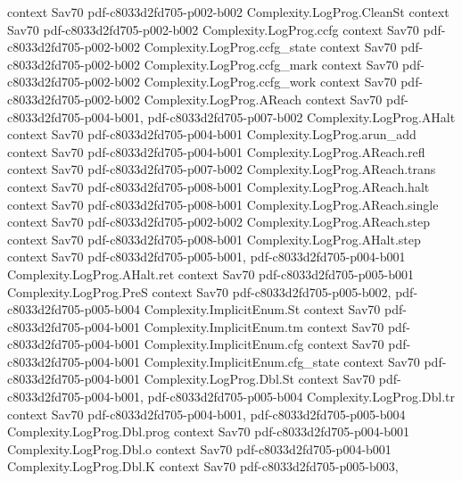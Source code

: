 \begin{theorem}
  {context}
  {Sav70}
  {pdf-c8033d2fd705-p002-b002}
\proofstep
  {Complexity.LogProg.CleanSt}
  {context}
  {Sav70}
  {pdf-c8033d2fd705-p002-b002}
\proofstep
  {Complexity.LogProg.ccfg}
  {context}
  {Sav70}
  {pdf-c8033d2fd705-p002-b002}
\proofstep
  {Complexity.LogProg.ccfg_state}
  {context}
  {Sav70}
  {pdf-c8033d2fd705-p002-b002}
\proofstep
  {Complexity.LogProg.ccfg_mark}
  {context}
  {Sav70}
  {pdf-c8033d2fd705-p002-b002}
\proofstep
  {Complexity.LogProg.ccfg_work}
  {context}
  {Sav70}
  {pdf-c8033d2fd705-p002-b002}
\proofstep
  {Complexity.LogProg.AReach}
  {context}
  {Sav70}
  {pdf-c8033d2fd705-p004-b001,
    pdf-c8033d2fd705-p007-b002}
\proofstep
  {Complexity.LogProg.AHalt}
  {context}
  {Sav70}
  {pdf-c8033d2fd705-p004-b001}
\proofstep
  {Complexity.LogProg.arun_add}
  {context}
  {Sav70}
  {pdf-c8033d2fd705-p004-b001}
\proofstep
  {Complexity.LogProg.AReach.refl}
  {context}
  {Sav70}
  {pdf-c8033d2fd705-p007-b002}
\proofstep
  {Complexity.LogProg.AReach.trans}
  {context}
  {Sav70}
  {pdf-c8033d2fd705-p008-b001}
\proofstep
  {Complexity.LogProg.AReach.halt}
  {context}
  {Sav70}
  {pdf-c8033d2fd705-p008-b001}
\proofstep
  {Complexity.LogProg.AReach.single}
  {context}
  {Sav70}
  {pdf-c8033d2fd705-p002-b002}
\proofstep
  {Complexity.LogProg.AReach.step}
  {context}
  {Sav70}
  {pdf-c8033d2fd705-p008-b001}
\proofstep
  {Complexity.LogProg.AHalt.step}
  {context}
  {Sav70}
  {pdf-c8033d2fd705-p005-b001,
    pdf-c8033d2fd705-p004-b001}
\proofstep
  {Complexity.LogProg.AHalt.ret}
  {context}
  {Sav70}
  {pdf-c8033d2fd705-p005-b001}
\proofstep
  {Complexity.LogProg.PreS}
  {context}
  {Sav70}
  {pdf-c8033d2fd705-p005-b002,
    pdf-c8033d2fd705-p005-b004}
\proofstep
  {Complexity.ImplicitEnum.St}
  {context}
  {Sav70}
  {pdf-c8033d2fd705-p004-b001}
\proofstep
  {Complexity.ImplicitEnum.tm}
  {context}
  {Sav70}
  {pdf-c8033d2fd705-p004-b001}
\proofstep
  {Complexity.ImplicitEnum.cfg}
  {context}
  {Sav70}
  {pdf-c8033d2fd705-p004-b001}
\proofstep
  {Complexity.ImplicitEnum.cfg_state}
  {context}
  {Sav70}
  {pdf-c8033d2fd705-p004-b001}
\proofstep
  {Complexity.LogProg.Dbl.St}
  {context}
  {Sav70}
  {pdf-c8033d2fd705-p004-b001,
    pdf-c8033d2fd705-p005-b004}
\proofstep
  {Complexity.LogProg.Dbl.tr}
  {context}
  {Sav70}
  {pdf-c8033d2fd705-p004-b001,
    pdf-c8033d2fd705-p005-b004}
\proofstep
  {Complexity.LogProg.Dbl.prog}
  {context}
  {Sav70}
  {pdf-c8033d2fd705-p004-b001}
\proofstep
  {Complexity.LogProg.Dbl.o}
  {context}
  {Sav70}
  {pdf-c8033d2fd705-p004-b001}
\proofstep
  {Complexity.LogProg.Dbl.K}
  {context}
  {Sav70}
  {pdf-c8033d2fd705-p005-b003,
}
\end{theorem}
